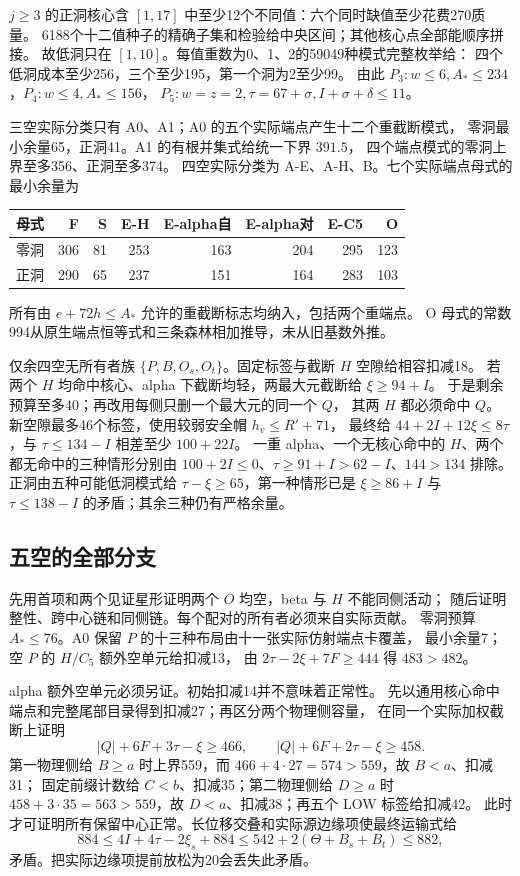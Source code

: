 \documentclass[11pt,a4paper]{article}
\newcommand{\A}{A_*}
\begin{document}
$j\ge3$ 的正洞核心含 $[1,17]$ 中至少12个不同值：六个同时缺值至少花费270质量。
6188个十二值种子的精确子集和检验给中央区间；其他核心点全部能顺序拼接。
故低洞只在 $[1,10]$。每值重数为0、1、2的59049种模式完整枚举给：
四个低洞成本至少256，三个至少195，第一个洞为2至少99。
由此 $P_3:w\le6,\A\le234$，$P_4:w\le4,\A\le156$，
$P_5:w=z=2,\tau=67+\sigma,I+\sigma+\delta\le11$。

三空实际分类只有 A0、A1；A0 的五个实际端点产生十二个重截断模式，
零洞最小余量65，正洞41。A1 的有根并集式给统一下界 $391.5$，
四个端点模式的零洞上界至多356、正洞至多374。
四空实际分类为 A-E、A-H、B。七个实际端点母式的最小余量为
\begin{center}
\begin{tabular}{lrrrrrrr}\toprule
母式&F&S&E-H&E-alpha自&E-alpha对&E-C5&O\\\midrule
零洞&306&81&253&163&204&295&123\\
正洞&290&65&237&151&164&283&103\\\bottomrule
\end{tabular}
\end{center}
所有由 $e+72h\le\A$ 允许的重截断标志均纳入，包括两个重端点。
O 母式的常数994从原生端点恒等式和三条森林相加推导，未从旧基数外推。

仅余四空无所有者族 $\{P,B,O_s,O_t\}$。固定标签与截断 $H$ 空隙给相容扣减18。
若两个 $H$ 均命中核心、alpha 下截断均轻，两最大元截断给 $\xi\ge94+I$。
于是剩余预算至多40；再改用每侧只删一个最大元的同一个 $Q$，
其两 $H$ 都必须命中 $Q$。新空隙最多46个标签，使用较弱安全帽 $h_v\le R'+71$，
最终给 $44+2I+12\xi\le8\tau$，与 $\tau\le134-I$ 相差至少 $100+22I$。
一重 alpha、一个无核心命中的 $H$、两个都无命中的三种情形分别由
$100+2I\le0$、$\tau\ge91+I>62-I$、$144>134$ 排除。
正洞由五种可能低洞模式给 $\tau-\xi\ge65$，第一种情形已是
$\xi\ge86+I$ 与 $\tau\le138-I$ 的矛盾；其余三种仍有严格余量。

\subsection{五空的全部分支}
先用首项和两个见证星形证明两个 $O$ 均空，beta 与 $H$ 不能同侧活动；
随后证明整性、跨中心链和同侧链。每个配对的所有者必须来自实际贡献。
零洞预算 $\A\le76$。A0 保留 $P$ 的十三种布局由十一张实际仿射端点卡覆盖，
最小余量7；空 $P$ 的 $H/C_5$ 额外空单元给扣减13，
由 $2\tau-2\xi+7F\ge444$ 得 $483>482$。

alpha 额外空单元必须另证。初始扣减14并不意味着正常性。
先以通用核心命中端点和完整尾部目录得到扣减27；再区分两个物理侧容量，
在同一个实际加权截断上证明
\[
 |Q|+6F+3\tau-\xi\ge466,\qquad |Q|+6F+2\tau-\xi\ge458.
\]
第一物理侧给 $B\ge a$ 时上界559，而 $466+4\cdot27=574>559$，故 $B<a$、扣减31；
固定前缀计数给 $C<b$、扣减35；第二物理侧给 $D\ge a$ 时
$458+3\cdot35=563>559$，故 $D<a$、扣减38；再五个 LOW 标签给扣减42。
此时才可证明所有保留中心正常。长位移交叠和实际源边缘项使最终运输式给
\[
 884\le4I+4\tau-2\xi_s+884
 \le542+2(\Theta+B_s+B_t)\le882,
\]
矛盾。把实际边缘项提前放松为20会丢失此矛盾。
\end{document}
